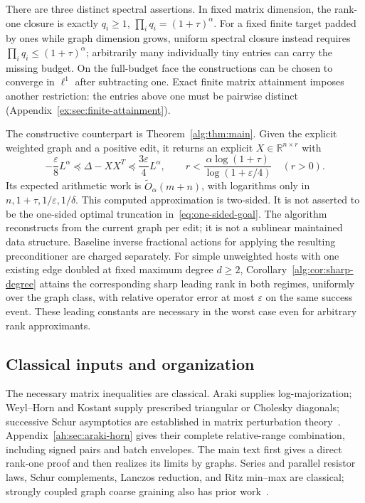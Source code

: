\documentclass[11pt]{article}
\newcommand{\R}{\mathbb R}
\begin{document}
There are three distinct spectral assertions. In fixed matrix dimension,
the rank-one closure is exactly
$q_i\ge1$, $\prod_iq_i=(1+\tau)^\alpha$.
For a fixed finite target padded by ones while graph dimension grows,
uniform spectral closure instead requires
$\prod_iq_i\le(1+\tau)^\alpha$; arbitrarily many individually tiny
entries can carry the missing budget. On the full-budget face the
constructions can be chosen to converge in $\ell^1$ after subtracting
one. Exact finite matrix attainment imposes another restriction:
the entries above one must be pairwise distinct
(Appendix~\ref{ex:sec:finite-attainment}).

The constructive counterpart is Theorem~\ref{alg:thm:main}. Given the
explicit weighted graph and a positive edit, it returns an explicit
$X\in\R^{n\times r}$ with
\[
 -\frac\varepsilon8L^\alpha\preceq\Delta-XX^T
       \preceq\frac{3\varepsilon}4L^\alpha,
 \qquad
 r<\frac{\alpha\log(1+\tau)}{\log(1+\varepsilon/4)}\quad(r>0).
\]
Its expected arithmetic work is $\widetilde O_\alpha(m+n)$, with
logarithms only in $n,1+\tau,1/\varepsilon,1/\delta$.
This computed approximation is two-sided. It is not asserted to be
the one-sided optimal truncation in~\eqref{eq:one-sided-goal}.
The algorithm reconstructs from the current graph per edit; it is not
a sublinear maintained data structure. Baseline inverse fractional
actions for applying the resulting preconditioner are charged separately.
For simple unweighted hosts with one existing edge doubled at fixed
maximum degree $d\ge2$,
Corollary~\ref{alg:cor:sharp-degree} attains the corresponding sharp
leading rank in both regimes, uniformly over the graph class,
with relative operator error at most $\varepsilon$ on the same success
event. These leading constants are necessary
in the worst case even for arbitrary rank approximants.

\subsection{Classical inputs and organization}
The necessary matrix inequalities are classical. Araki supplies
log-majorization; Weyl--Horn and Kostant supply prescribed triangular
or Cholesky diagonals; successive Schur asymptotics are established
in matrix perturbation theory~\cite{Araki,Horn,LiMathias,Kostant,HT,UB,GAH}.
Appendix~\ref{ah:sec:araki-horn} gives their complete relative-range
combination, including signed pairs and batch envelopes. The main text
first gives a direct rank-one proof and then realizes its limits by
graphs. Series and parallel resistor laws, Schur complements,
Lanczos reduction, and Ritz min--max are classical; strongly coupled
graph coarse graining also has prior work~\cite{Koke}.
\end{document}
